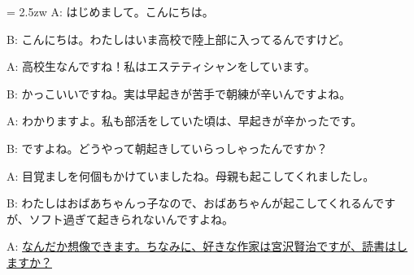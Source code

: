 \documentclass[11pt]{amsart}
\title{}
\author{}
\newenvironment{hangall}[1]{\hangindent = 2.5zw\everypar{\hangindent = 2.5zw}}{}
\begin{document}
\maketitle
\begin{hangall}{}%
A: はじめまして。こんにちは。

B: こんにちは。わたしはいま高校で陸上部に入ってるんですけど。

A: 高校生なんですね！私はエステティシャンをしています。

B: かっこいいですね。実は早起きが苦手で朝練が辛いんですよね。

A: わかりますよ。私も部活をしていた頃は、早起きが辛かったです。

B: ですよね。どうやって朝起きしていらっしゃったんですか？

A: 目覚ましを何個もかけていましたね。母親も起こしてくれましたし。

B: わたしはおばあちゃんっ子なので、おばあちゃんが起こしてくれるんですが、ソフト過ぎて起きられないんですよね。

A: \ul{なんだか想像できます。ちなみに、好きな作家は宮沢賢治ですが、読書はしますか？}\end{hangall}
\end{document}
